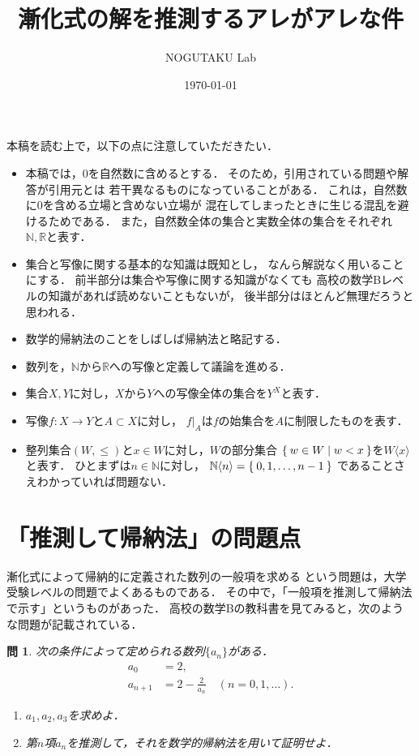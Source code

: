 \documentclass[11pt,a4paper]{ltjsarticle} %
\title{漸化式の解を推測するアレがアレな件}
\author{NOGUTAKU Lab}
\date{\today}
\theoremstyle{mystyle} %
\newtheorem{que}{問} %
\begin{document}
%
\maketitle

本稿を読む上で，以下の点に注意していただきたい．
\begin{itemize}
  \item 本稿では，0を自然数に含めるとする．
    そのため，引用されている問題や解答が引用元とは
    若干異なるものになっていることがある．
    これは，自然数に0を含める立場と含めない立場が
    混在してしまったときに生じる混乱を避けるためである．
    また，自然数全体の集合と実数全体の集合をそれぞれ
    $\mathbb{N}, \mathbb{R}$と表す．
  \item 集合と写像に関する基本的な知識は既知とし，
    なんら解説なく用いることにする．
    前半部分は集合や写像に関する知識がなくても
    高校の数学Bレベルの知識があれば読めないこともないが，
    後半部分はほとんど無理だろうと思われる．
  \item 数学的帰納法のことをしばしば帰納法と略記する．
  \item 数列を，$\mathbb{N}$から$\mathbb{R}$への写像と定義して議論を進める．
  \item 集合$X,Y$に対し，$X$から$Y$への写像全体の集合を$Y^X$と表す．
  \item 写像$f \colon X \longrightarrow Y$と$A \subset X$に対し，
    $f|_A$は$f$の始集合を$A$に制限したものを表す．
  \item 整列集合$(W, \leq)$と$x \in W$に対し，$W$の部分集合
    $\Set{ w \in W \mid w < x}$を$W \langle x \rangle$と表す．
    ひとまずは$n \in \mathbb{N}$に対し，
    $\mathbb{N} \langle n \rangle = \Set{ 0, 1, \ldots, n-1}$
    であることさえわかっていれば問題ない．
\end{itemize}
%

\section{「推測して帰納法」の問題点}

漸化式によって帰納的に定義された数列の一般項を求める
という問題は，大学受験レベルの問題でよくあるものである．
その中で，「一般項を推測して帰納法で示す」というものがあった．
高校の数学Bの教科書\cite{kyoukasyo}を見てみると，次のような問題が記載されている．

\begin{que} \label{que:suisoku}
  次の条件によって定められる数列$\{ a_n \}$がある．
  \begin{align*}
    a_0 & = 2 , \\
    a_{n+1} & = 2- \frac{2}{a_n} \quad ( n = 0,1, \ldots).
  \end{align*}
  \begin{enumerate}
    \item $a_1,a_2,a_3$を求めよ．
    \item 第$n$項$a_n$を推測して，それを数学的帰納法を用いて証明せよ．
  \end{enumerate}
\end{que}
\end{document}
